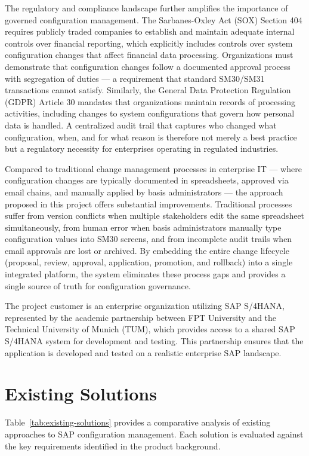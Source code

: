 \documentclass[12pt,a4paper]{report}
\begin{document}
The regulatory and compliance landscape further amplifies the importance of governed configuration management. The Sarbanes-Oxley Act (SOX) Section 404 requires publicly traded companies to establish and maintain adequate internal controls over financial reporting, which explicitly includes controls over system configuration changes that affect financial data processing. Organizations must demonstrate that configuration changes follow a documented approval process with segregation of duties --- a requirement that standard SM30/SM31 transactions cannot satisfy. Similarly, the General Data Protection Regulation (GDPR) Article 30 mandates that organizations maintain records of processing activities, including changes to system configurations that govern how personal data is handled. A centralized audit trail that captures who changed what configuration, when, and for what reason is therefore not merely a best practice but a regulatory necessity for enterprises operating in regulated industries.

Compared to traditional change management processes in enterprise IT --- where configuration changes are typically documented in spreadsheets, approved via email chains, and manually applied by basis administrators --- the approach proposed in this project offers substantial improvements. Traditional processes suffer from version conflicts when multiple stakeholders edit the same spreadsheet simultaneously, from human error when basis administrators manually type configuration values into SM30 screens, and from incomplete audit trails when email approvals are lost or archived. By embedding the entire change lifecycle (proposal, review, approval, application, promotion, and rollback) into a single integrated platform, the system eliminates these process gaps and provides a single source of truth for configuration governance.

The project customer is an enterprise organization utilizing SAP S/4HANA, represented by the academic partnership between FPT University and the Technical University of Munich (TUM), which provides access to a shared SAP S/4HANA system for development and testing. This partnership ensures that the application is developed and tested on a realistic enterprise SAP landscape.


\section{Existing Solutions}

Table~\ref{tab:existing-solutions} provides a comparative analysis of existing approaches to SAP configuration management. Each solution is evaluated against the key requirements identified in the product background.
\end{document}
